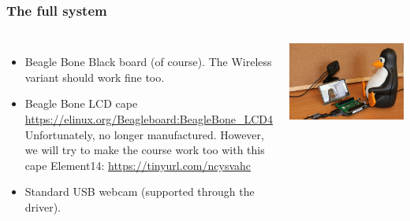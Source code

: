 \begin{frame}
  \frametitle{The full system}
  \begin{columns}
    \begin{itemize}
	\item Beagle Bone Black board (of course). The Wireless variant
	      should work fine too.
	\item Beagle Bone LCD cape\\
              \url{https://elinux.org/Beagleboard:BeagleBone_LCD4}\\
	      Unfortunately, no longer manufactured. However, we will
              try to make the course work too with this cape Element14:
              \url{https://tinyurl.com/ncysvahc}
        \item Standard USB webcam (supported through the 
	      driver).
    \end{itemize}
     \includegraphics[width=\textwidth]{common/beaglecam.jpg}
  \end{columns}
\end{frame}



